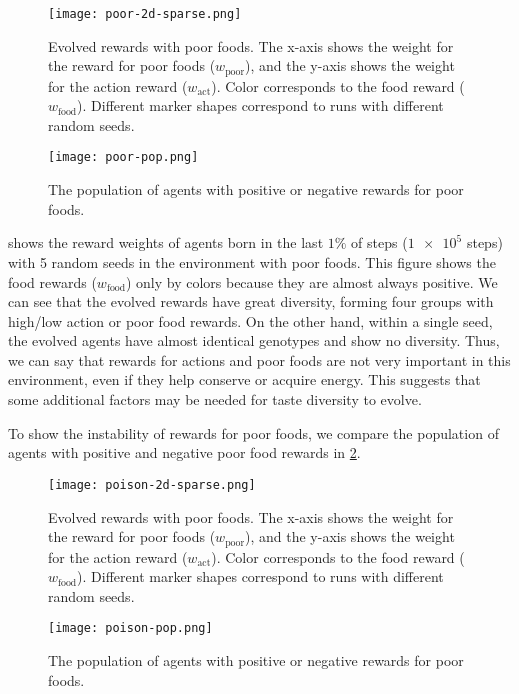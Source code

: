 \begin{figure}[t]
  \centering
  \texttt{[image: poor-2d-sparse.png]}
  \caption{
    Evolved rewards with poor foods.
    The x-axis shows the weight for the reward for poor foods ($w_{\mathrm{poor}}$), and the y-axis shows the weight for the action reward ($w_{\mathrm{act}}$).
    Color corresponds to the food reward ($w_{\mathrm{food}}$).
    Different marker shapes correspond to runs with different random seeds.
  }\label{figure:result-poor}
\end{figure}

\begin{figure}[t]
  \centering
  \texttt{[image: poor-pop.png]}
  \caption{
    The population of agents with positive or negative rewards for poor foods.
  }\label{figure:pop-poor}
\end{figure}

 shows the reward weights of agents born in the last $1\%$ of steps ($\num{1e5}$ steps) with 5 random seeds in the environment with poor foods. This figure shows the food rewards ($w_\mathrm{food}$) only by colors because they are almost always positive. We can see that the evolved rewards have great diversity, forming four groups with high/low action or poor food rewards. On the other hand, within a single seed, the evolved agents have almost identical genotypes and show no diversity. Thus, we can say that rewards for actions and poor foods are not very important in this environment, even if they help conserve or acquire energy. This suggests that some additional factors may be needed for taste diversity to evolve.

To show the instability of rewards for poor foods, we compare the population of agents with positive and negative poor food rewards in \cref{figure:pop-poor}.

\begin{figure}[t]
  \centering
  \texttt{[image: poison-2d-sparse.png]}
  \caption{
    Evolved rewards with poor foods.
    The x-axis shows the weight for the reward for poor foods ($w_{\mathrm{poor}}$), and the y-axis shows the weight for the action reward ($w_{\mathrm{act}}$).
    Color corresponds to the food reward ($w_{\mathrm{food}}$).
    Different marker shapes correspond to runs with different random seeds.
  }\label{figure:result-poison}
\end{figure}

\begin{figure}[t]
  \centering
  \texttt{[image: poison-pop.png]}
  \caption{
    The population of agents with positive or negative rewards for poor foods.
  }\label{figure:poison-pop}
\end{figure}

